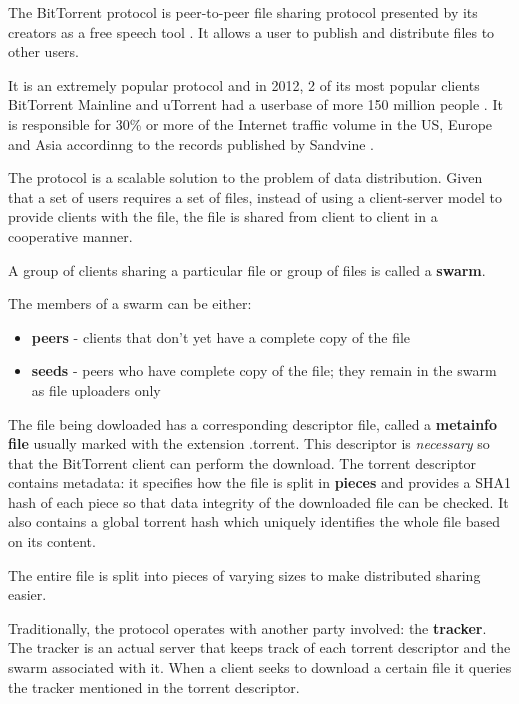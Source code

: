\documentclass[11pt]{article} %
\begin{document}
The BitTorrent protocol is peer-to-peer file sharing protocol presented by its creators as a free speech tool \citep*{web:btIntro}. It allows a user to publish and distribute files to other users.

It is an extremely popular protocol and in 2012, 2 of its most popular clients BitTorrent Mainline and uTorrent had a userbase of more 150 million people  \citep*{web:btOrgUsers}. It is responsible for 30\% or more of the Internet traffic volume in the US, Europe and Asia accordinng to the records published by Sandvine \citep*{sandvineInternet}.

The protocol \citep*{btProtocol} is a scalable solution to the problem of data distribution. Given that a set of users requires a set of files, instead of using a client-server model to provide clients with the file, the file is shared from client to client in a cooperative manner.

A group of clients sharing a particular file or group of files is called a \textbf{swarm}. 

The members of a swarm can be either:
\begin{itemize}
\item \textbf{peers} - clients that don't yet have a complete copy of the file
\item \textbf{seeds} - peers who have complete copy of the file; they remain in the swarm as file uploaders only
\end{itemize}

The file being dowloaded has a corresponding descriptor file, called a \textbf{metainfo file} usually marked with the extension .torrent. This descriptor is \textit{necessary} so that the BitTorrent client can perform the download. The torrent descriptor contains metadata: it specifies how the file is split in \textbf{pieces} and provides a SHA1 hash of each piece so that data integrity of the downloaded file can be checked. It also contains a global torrent hash which uniquely identifies the whole file based on its content.

The entire file is split into pieces of varying sizes to make distributed sharing easier.

Traditionally, the protocol operates with another party involved: the \textbf{tracker}. The tracker is an actual server that keeps track of each torrent descriptor and the swarm associated with it. When a client seeks to download a certain file it queries the tracker mentioned in the torrent descriptor.
\end{document}
